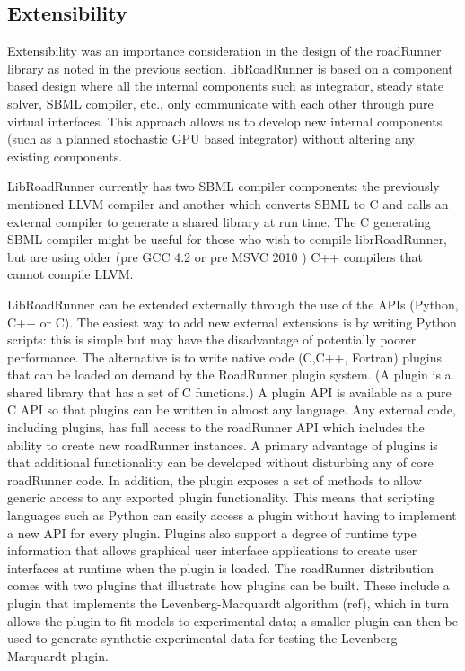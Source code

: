 \documentclass{bioinfo}
\begin{document}
\subsection{Extensibility} 

Extensibility was an importance consideration in the design of the roadRunner library as noted in the previous section. libRoadRunner is based on a component based design where all the internal components such as integrator, steady state solver, SBML compiler, etc., only communicate with each other through pure virtual interfaces. This approach allows us to develop new internal components (such as a planned stochastic GPU based integrator) without altering any existing components. 

LibRoadRunner currently has two SBML compiler components: the previously mentioned LLVM compiler and another which converts SBML to C and calls an external compiler to generate a shared library at run time. The C generating SBML compiler might be useful for those who wish to compile librRoadRunner, but are using older (pre GCC 4.2 or pre MSVC 2010 ) C++ compilers that cannot compile LLVM.  

LibRoadRunner can be extended externally through the use of the APIs (Python, C++ or C).  The easiest way to add new external extensions is by writing Python scripts: this is simple but may have the disadvantage of potentially poorer performance. The alternative is to write native code (C,C++, Fortran) plugins that can be loaded on demand by the RoadRunner plugin system.  (A plugin is a shared library that has a set of C functions.) A plugin API is available as a pure C API so that plugins can be written in almost any language.  Any external code, including plugins, has full access to the roadRunner API which includes the ability to create new roadRunner instances. A primary advantage of plugins is that additional functionality can be developed without disturbing any of core roadRunner code. In addition, the plugin exposes a set of methods to allow generic access to any exported plugin functionality. This means that scripting languages such as Python can easily access a plugin without having to implement a new API for every plugin. Plugins also support a degree of runtime type information that allows graphical user interface applications to create user interfaces at runtime when the plugin is loaded. The roadRunner distribution comes with two plugins that illustrate how plugins can be built. These include a plugin that implements the Levenberg-Marquardt algorithm (ref), which in turn allows the plugin to fit models to experimental data; a smaller plugin can then be used to generate synthetic experimental data for testing the Levenberg-Marquardt plugin.
\end{document}
